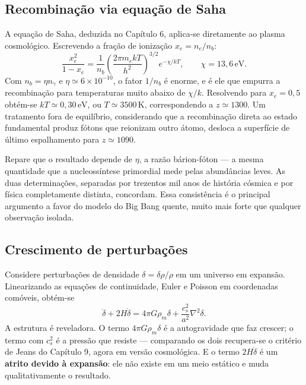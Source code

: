 \documentclass[11pt,a4paper]{article}
\begin{document}
\subsection*{Recombinação via equação de Saha}

A equação de Saha, deduzida no Capítulo 6, aplica-se diretamente ao plasma cosmológico. Escrevendo a fração de ionização $x_e=n_e/n_b$:
\[
\frac{x_e^{2}}{1-x_e}=\frac{1}{n_b}\left(\frac{2\pi m_ekT}{h^{2}}\right)^{3/2}e^{-\chi/kT},
\qquad \chi=13{,}6\,\mathrm{eV}.
\]
Com $n_b=\eta n_\gamma$ e $\eta\simeq6\times10^{-10}$, o fator $1/n_b$ é enorme, e é ele que empurra a recombinação para temperaturas muito abaixo de $\chi/k$. Resolvendo para $x_e=0{,}5$ obtém-se $kT\simeq0{,}30\,\mathrm{eV}$, ou $T\simeq3500\,\mathrm{K}$, correspondendo a $z\simeq1300$. Um tratamento fora de equilíbrio, considerando que a recombinação direta ao estado fundamental produz fótons que reionizam outro átomo, desloca a superfície de último espalhamento para $z\simeq1090$.

Repare que o resultado depende de $\eta$, a razão bárion-fóton --- a mesma quantidade que a nucleossíntese primordial mede pelas abundâncias leves. As duas determinações, separadas por trezentos mil anos de história cósmica e por física completamente distinta, concordam. Essa consistência é o principal argumento a favor do modelo do Big Bang quente, muito mais forte que qualquer observação isolada.

\subsection*{Crescimento de perturbações}

Considere perturbações de densidade $\delta=\delta\rho/\rho$ em um universo em expansão. Linearizando as equações de continuidade, Euler e Poisson em coordenadas comóveis, obtém-se
\[
\ddot{\delta}+2H\dot{\delta}=4\pi G\rho_m\delta+\frac{c_s^{2}}{a^{2}}\nabla^{2}\delta.
\]
A estrutura é reveladora. O termo $4\pi G\rho_m\delta$ é a autogravidade que faz crescer; o termo com $c_s^{2}$ é a pressão que resiste --- comparando os dois recupera-se o critério de Jeans do Capítulo 9, agora em versão cosmológica. E o termo $2H\dot{\delta}$ é um \textbf{atrito devido à expansão}: ele não existe em um meio estático e muda qualitativamente o resultado.
\end{document}
